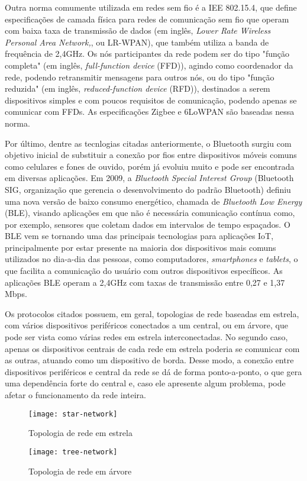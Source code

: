 \documentclass[../monografia.tex]{subfiles}
\begin{document}
Outra norma comumente utilizada em redes sem fio é a IEE 802.15.4, que define especificações de camada física para redes de comunicação sem fio que operam com baixa taxa de transmissão de dados (em inglês, \textit{Lower Rate Wireless Personal Area Network,}, ou LR-WPAN), que também utiliza a banda de frequência de 2,4GHz\cite{802.15.4}. Os nós participantes da rede podem ser do tipo "função completa" (em inglês, \textit{full-function device} (FFD)), agindo como coordenador da rede, podendo retransmitir mensagens para outros nós, ou do tipo "função reduzida" (em inglês, \textit{reduced-function device} (RFD)), destinados a serem dispositivos simples e com poucos requisitos de comunicação, podendo apenas se comunicar com FFDs. As especificações Zigbee e 6LoWPAN são baseadas nessa norma.

Por último, dentre as tecnlogias citadas anteriormente, o Bluetooth surgiu com objetivo inicial de substituir a conexão por fios entre dispositivos móveis comuns como celulares e fones de ouvido, porém já evoluiu muito e pode ser encontrada em diversas aplicações. Em 2009, a \textit{Bluetooth Special Interest Group} (Bluetooth SIG, organização que gerencia o desenvolvimento do padrão Bluetooth) definiu uma nova versão de baixo consumo energético, chamada de \textit{Bluetooth Low Energy} (BLE), visando aplicações em que não é necessária comunicação contínua como, por exemplo, sensores que coletam dados em intervalos de tempo espaçados. O BLE vem se tornando uma das principais tecnologias para aplicações IoT, principalmente por estar presente na maioria dos dispositivos mais comuns utilizados no dia-a-dia das pessoas, como computadores, \textit{smartphones} e \textit{tablets}, o que facilita a comunicação do usuário com outros dispositivos específicos. As aplicações BLE operam a 2,4GHz com taxas de transmissão entre 0,27 e 1,37 Mbps\cite{ble-datarate}.

Os protocolos citados possuem, em geral, topologias de rede baseadas em estrela, com vários dispositivos periféricos conectados a um central, ou em árvore, que pode ser vista como várias redes em estrela interconectadas. No segundo caso, apenas os dispositivos centrais de cada rede em estrela poderia se comunicar com as outras, atuando como um dispositivo de borda. Desse modo, a conexão entre dispositivos periféricos e central da rede se dá de forma ponto-a-ponto, o que gera uma dependência forte do central e, caso ele apresente algum problema, pode afetar o funcionamento da rede inteira.


\begin{figure}[h!]
\centering
\begin{minipage}{.5\textwidth}
	\centering	
	\texttt{[image: star-network]}
	\caption{Topologia de rede em estrela}
	\label{fig:Rede em estrela}
\end{minipage}%
\begin{minipage}{.5\textwidth}
	\centering
	\texttt{[image: tree-network]}
	\caption{Topologia de rede em árvore}
	\label{fig:Rede em árvore}
\end{minipage}

\end{figure}
\end{document}
